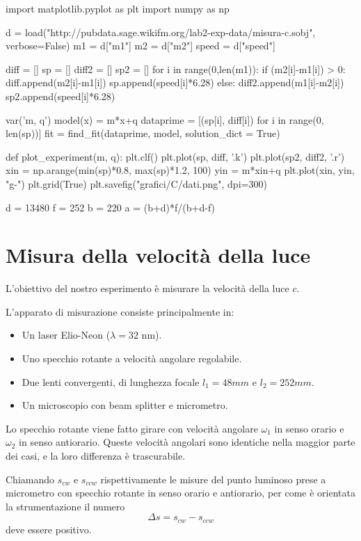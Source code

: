 \begin{sagesilent}
import matplotlib.pyplot as plt
import numpy as np

d = load("http://pubdata.sage.wikifm.org/lab2-exp-data/misura-c.sobj", verbose=False)
m1 = d["m1"]
m2 = d["m2"]
speed = d["speed"]

diff = []
sp = []
diff2 = []
sp2 = []
for i in range(0,len(m1)):
    if (m2[i]-m1[i]) > 0:
        diff.append(m2[i]-m1[i])
        sp.append(speed[i]*6.28)
    else:
        diff2.append(m1[i]-m2[i])
        sp2.append(speed[i]*6.28)

var('m, q')
model(x) = m*x+q
dataprime = [(sp[i], diff[i]) for i in range(0, len(sp))]
fit = find_fit(dataprime, model, solution_dict = True)

def plot_experiment(m, q):
    plt.clf()
    plt.plot(sp, diff, '.k')
    plt.plot(sp2, diff2, '.r')
    xin = np.arange(min(sp)*0.8, max(sp)*1.2, 100)
    yin = m*xin+q
    plt.plot(xin, yin, "g-")
    plt.grid(True)
    plt.savefig("grafici/C/dati.png", dpi=300)
    
d = 13480
f = 252
b = 220
a = (b+d)*f/(b+d-f)
\end{sagesilent}


\chapter{Misura della velocità della luce}

L'obiettivo del nostro esperimento è misurare la velocità della luce $c$.

L'apparato di misurazione consiste principalmente in:
\begin{itemize}
 \item Un laser Elio-Neon ($\lambda=32$ nm).
 \item Uno specchio rotante a velocità angolare regolabile.
 \item Due lenti convergenti, di lunghezza focale $l_1 = 48mm$ e $l_2 = 252 mm$.
 \item Un microscopio con beam splitter e micrometro.
\end{itemize}

Lo specchio rotante viene fatto girare con velocità angolare $\omega_1$ in senso orario e $\omega_2$ in senso antiorario. Queste velocità angolari sono identiche nella maggior parte dei casi, e la loro differenza è trascurabile.

Chiamando $s_{cw}$ e $s_{ccw}$ rispettivamente le misure del punto luminoso prese a micrometro con specchio rotante in senso orario e antiorario, per come è orientata la strumentazione il numero
$$\Delta s = s_{cw} - s_{ccw}$$
deve essere positivo.


